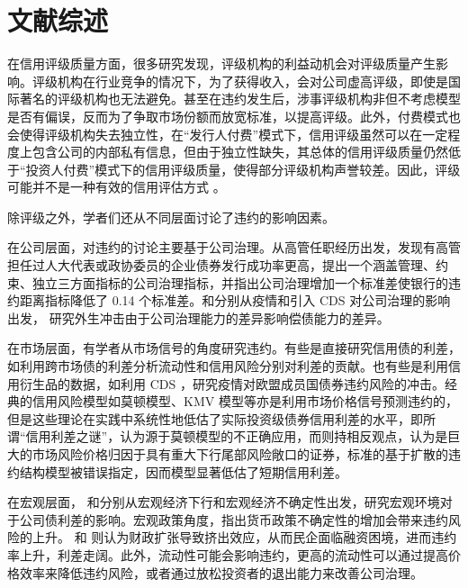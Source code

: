 \section{文献综述}
\label{sec:zs}
在信用评级质量方面，很多研究发现，评级机构的利益动机会对评级质量产生影响。评级机构在行业竞争的情况下，为了获得收入，会对公司虚高评级，即使是国际著名的评级机构也无法避免\cite{opp2013rating}。甚至在违约发生后，涉事评级机构非但不考虑模型是否有偏误，反而为了争取市场份额而放宽标准，以提高评级\cite{黄小琳2017债券违约对涉事信用评级机构的影响}。此外，付费模式也会使得评级机构失去独立性，在“发行人付费”模式下，信用评级虽然可以在一定程度上包含公司的内部私有信息，但由于独立性缺失，其总体的信用评级质量仍然低于“投资人付费”模式下的信用评级质量，使得部分评级机构声誉较差\cite{吴育辉2020,陈关亭2021多重信用评级与债券融资成本}。因此，评级可能并不是一种有效的信用评估方式 \cite{blochlinger2018ratings}。

除评级之外，学者们还从不同层面讨论了违约的影响因素。

在公司层面，对违约的讨论主要基于公司治理。\Textcite{林晚发2018高管任职经历的得与失}从高管任职经历出发，发现有高管担任过人大代表或政协委员的企业债券发行成功率更高，\Textcite{anginer2018corporate}提出一个涵盖管理、约束、独立三方面指标的公司治理指标，并指出公司治理增加一个标准差使银行的违约距离指标降低了 0.14 个标准差。\Textcite{ding2021corporate}和\Textcite{subrahmanyam2017credit}分别从疫情和引入 CDS 对公司治理的影响出发， 研究外生冲击由于公司治理能力的差异影响偿债能力的差异。

在市场层面，有学者从市场信号的角度研究违约。有些是直接研究信用债的利差，如\Textcite{纪志宏2017信用风险溢价还是市场流动性溢价}利用跨市场债的利差分析流动性和信用风险分别对利差的贡献。也有些是利用信用衍生品的数据，如\Textcite{bonaccolto2021breakup}利用 CDS ，研究疫情对欧盟成员国债券违约风险的冲击。经典的信用风险模型如莫顿模型、KMV 模型等亦是利用市场价格信号预测违约的，但是这些理论在实践中系统性地低估了实际投资级债券信用利差的水平，即所谓“信用利差之谜”，\Textcite{feldhutter2018myth}认为源于莫顿模型的不正确应用，而\Textcite{bai2020credit}则持相反观点，认为是巨大的市场风险价格归因于具有重大下行尾部风险敞口的证券，标准的基于扩散的违约结构模型被错误指定，因而模型显著低估了短期信用利差。

在宏观层面，\Textcite{bai2019common} 和\Textcite{bali2021macroeconomic}分别从宏观经济下行和宏观经济不确定性出发，研究宏观环境对于公司债利差的影响。宏观政策角度，\Textcite{王博2019货币政策不确定性}指出货币政策不确定性的增加会带来违约风险的上升。\Textcite{梅冬州2021财政扩张} 和\Textcite{2020Fiscal} 则认为财政扩张导致挤出效应，从而民企面临融资困境，进而违约率上升，利差走阔。此外，流动性可能会影响违约\cite{brogaard2017stock}，更高的流动性可以通过提高价格效率来降低违约风险，或者通过放松投资者的退出能力来改善公司治理。

